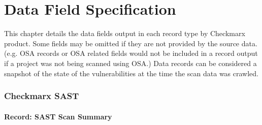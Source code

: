 \chapter{Data Field Specification}\label{chap:spec}

This chapter details the data fields output in each record type by Checkmarx product. Some fields may be omitted if they are not provided
by the source data.  (e.g. OSA records or OSA related fields would not be included in a record output if a project was not being scanned
using OSA.)  Data records can be considered a snapshot of the state of the vulnerabilities at the time the scan data was crawled.


\subsection{Checkmarx SAST}

\subsubsection{Record: SAST Scan Summary}

